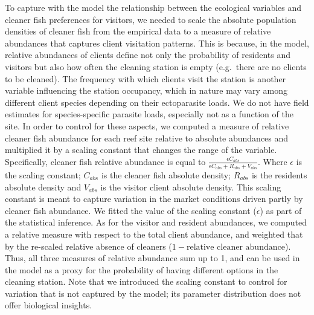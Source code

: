 \documentclass[
  12pt,
]{article}
\begin{document}
To capture with the model the relationship between the ecological
variables and cleaner fish preferences for visitors, we needed to scale
the absolute population densities of cleaner fish from the empirical
data to a measure of relative abundances that captures client visitation
patterns. This is because, in the model, relative abundances of clients
define not only the probability of residents and visitors but also how
often the cleaning station is empty (e.g.~there are no clients to be
cleaned). The frequency with which clients visit the station is another
variable influencing the station occupancy, which in nature may vary
among different client species depending on their ectoparasite loads. We
do not have field estimates for species-specific parasite loads,
especially not as a function of the site. In order to control for these
aspects, we computed a measure of relative cleaner fish abundance for
each reef site relative to absolute abundances and multiplied it by a
scaling constant that changes the range of the variable. Specifically,
cleaner fish relative abundance is equal to
\(\frac{\epsilon C_{abs}}{\epsilon C_{abs}+R_{abs}+V_{abs}}\). Where
\(\epsilon\) is the scaling constant; \(C_{abs}\) is the cleaner fish
absolute density; \(R_{abs}\) is the residents absolute density and
\(V_{abs}\) is the visitor client absolute density. This scaling
constant is meant to capture variation in the market conditions driven
partly by cleaner fish abundance. We fitted the value of the scaling
constant (\(\epsilon\)) as part of the statistical inference. As for the
visitor and resident abundances, we computed a relative measure with
respect to the total client abundance, and weighted that by the
re-scaled relative absence of cleaners
(\(1-\text{relative cleaner abundance}\)). Thus, all three measures of
relative abundance sum up to 1, and can be used in the model as a proxy
for the probability of having different options in the cleaning station.
Note that we introduced the scaling constant to control for variation
that is not captured by the model; its parameter distribution does not
offer biological insights.
\end{document}
